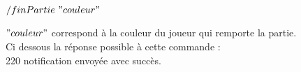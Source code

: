 \par

$/finPartie ~ "couleur"$

$"couleur"$ correspond à la couleur du joueur qui remporte la partie.\\

Ci dessous la réponse possible à cette commande : \\
220 notification envoyée avec succès. \\